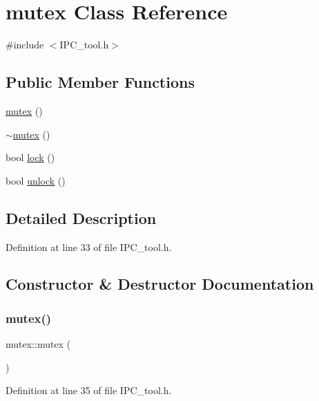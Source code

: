 \hypertarget{classmutex}{}\section{mutex Class Reference}
\label{classmutex}


{\ttfamily \#include $<$I\+P\+C\+\_\+tool.\+h$>$}

\subsection*{Public Member Functions}
\begin{DoxyCompactItemize}
\item 
\hyperlink{classmutex_a6b7350155befa79a8c6ad27c4c794b1e}{mutex} ()
\item 
\hyperlink{classmutex_ae30185d87a48c5451a04c2861ba3d034}{$\sim$mutex} ()
\item 
bool \hyperlink{classmutex_afc56ba139d699d2d9d388141209c6e43}{lock} ()
\item 
bool \hyperlink{classmutex_a47bc4d60f08056af411b57e321959fe1}{unlock} ()
\end{DoxyCompactItemize}


\subsection{Detailed Description}


Definition at line 33 of file I\+P\+C\+\_\+tool.\+h.



\subsection{Constructor \& Destructor Documentation}
\mbox{\label{classmutex_a6b7350155befa79a8c6ad27c4c794b1e}} 
\subsubsection{\texorpdfstring{mutex()}{mutex()}}
{\footnotesize\ttfamily mutex\+::mutex (\begin{DoxyParamCaption}{ }\end{DoxyParamCaption})\hspace{0.3cm}{\ttfamily [inline]}}



Definition at line 35 of file I\+P\+C\+\_\+tool.\+h.

